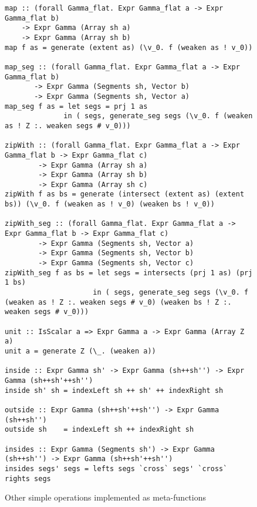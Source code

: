 \begin{figure}
\begin{lstlisting}[style=ndp]
map :: (forall Gamma_flat. Expr Gamma_flat a -> Expr Gamma_flat b)
    -> Expr Gamma (Array sh a)
    -> Expr Gamma (Array sh b)
map f as = generate (extent as) (\v_0. f (weaken as ! v_0))

map_seg :: (forall Gamma_flat. Expr Gamma_flat a -> Expr Gamma_flat b)
       -> Expr Gamma (Segments sh, Vector b)
       -> Expr Gamma (Segments sh, Vector a)
map_seg f as = let segs = prj 1 as
              in ( segs, generate_seg segs (\v_0. f (weaken as ! Z :. weaken segs # v_0)))

zipWith :: (forall Gamma_flat. Expr Gamma_flat a -> Expr Gamma_flat b -> Expr Gamma_flat c)
        -> Expr Gamma (Array sh a)
        -> Expr Gamma (Array sh b)
        -> Expr Gamma (Array sh c)
zipWith f as bs = generate (intersect (extent as) (extent bs)) (\v_0. f (weaken as ! v_0) (weaken bs ! v_0))

zipWith_seg :: (forall Gamma_flat. Expr Gamma_flat a -> Expr Gamma_flat b -> Expr Gamma_flat c)
        -> Expr Gamma (Segments sh, Vector a)
        -> Expr Gamma (Segments sh, Vector b)
        -> Expr Gamma (Segments sh, Vector c)
zipWith_seg f as bs = let segs = intersects (prj 1 as) (prj 1 bs)
                     in ( segs, generate_seg segs (\v_0. f (weaken as ! Z :. weaken segs # v_0) (weaken bs ! Z :. weaken segs # v_0)))

unit :: IsScalar a => Expr Gamma a -> Expr Gamma (Array Z a)
unit a = generate Z (\_. (weaken a))

inside :: Expr Gamma sh' -> Expr Gamma (sh++sh'') -> Expr Gamma (sh++sh'++sh'')
inside sh' sh = indexLeft sh ++ sh' ++ indexRight sh

outside :: Expr Gamma (sh++sh'++sh'') -> Expr Gamma (sh++sh'')
outside sh    = indexLeft sh ++ indexRight sh

insides :: Expr Gamma (Segments sh') -> Expr Gamma (sh++sh'') -> Expr Gamma (sh++sh'++sh'')
insides segs' segs = lefts segs `cross` segs' `cross` rights segs

\end{lstlisting}
\caption{Other simple operations implemented as meta-functions}
\label{fig:lst-auxiliary}
\end{figure}
%

